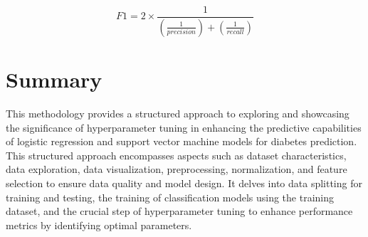 \begin{equation}
\label{eq:f1-score} 
F1 = 2 \times \frac{1}{(\frac{1}{precision}) + (\frac{1}{recall})}
\end{equation}

\section{Summary}
 This methodology provides a structured approach to exploring and showcasing the significance of hyperparameter tuning in enhancing the predictive capabilities of logistic regression and support vector machine models for diabetes prediction. This structured approach encompasses aspects such as dataset characteristics, data exploration, data visualization, preprocessing, normalization, and feature selection to ensure data quality and model design. It delves into data splitting for training and testing, the training of classification models using the training dataset, and the crucial step of hyperparameter tuning to enhance performance metrics by identifying optimal parameters.
 


